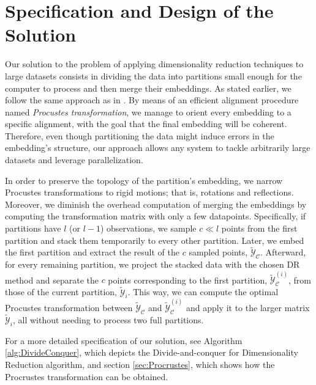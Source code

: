 \section{Specification and Design of the Solution}

Our solution to the problem of applying dimensionality reduction techniques to large datasets consists in dividing the data into partitions small enough for the computer to process and then merge their embeddings. As stated earlier, we follow the same approach as in \cite{Delicado2024}. By means of an efficient alignment procedure named \textit{Procustes transformation}, we manage to orient every embedding to a specific alignment, with the goal that the final embedding will be coherent. Therefore, even though partitioning the data might induce errors in the embedding's structure, our approach allows any system to tackle arbitrarily large datasets and leverage parallelization.

In order to preserve the topology of the partition's embedding, we narrow Procustes transformations to rigid motions; that is, rotations and reflections. Moreover, we diminish the overhead computation of merging the embeddings by computing the transformation matrix with only a few datapoints. Specifically, if partitions have $l$ (or $l-1$) observations, we sample $c \ll l$ points from the first partition and stack them temporarily to every other partition. Later, we embed the first partition and extract the result of the $c$ sampled points, $\tilde{\mathcal{Y}}_{\mathcal{C}}$. Afterward, for every remaining partition, we project the stacked data with the chosen DR method and separate the $c$ points corresponding to the first partition, $\tilde{\mathcal{Y}}_{\mathcal{C}}^{(i)}$, from those of the current partition, $\tilde{\mathcal{Y}}_{i}$. This way, we can compute the optimal Procustes transformation between $\tilde{\mathcal{Y}}_{\mathcal{C}}$ and $\tilde{\mathcal{Y}}_{\mathcal{C}}^{(i)}$ and apply it to the larger matrix $\tilde{\mathcal{Y}}_i$, all without needing to process two full partitions.

For a more detailed specification of our solution, see Algorithm \ref{alg:DivideConquer}, which depicts the Divide-and-conquer for Dimensionality Reduction algorithm, and section \ref{sec:Procrustes}, which shows how the Procrustes transformation can be obtained.

